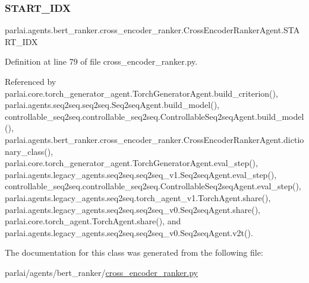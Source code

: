 \subsubsection{\texorpdfstring{S\+T\+A\+R\+T\+\_\+\+I\+DX}{START\_IDX}}
{\footnotesize\ttfamily parlai.\+agents.\+bert\+\_\+ranker.\+cross\+\_\+encoder\+\_\+ranker.\+Cross\+Encoder\+Ranker\+Agent.\+S\+T\+A\+R\+T\+\_\+\+I\+DX}



Definition at line 79 of file cross\+\_\+encoder\+\_\+ranker.\+py.



Referenced by parlai.\+core.\+torch\+\_\+generator\+\_\+agent.\+Torch\+Generator\+Agent.\+build\+\_\+criterion(), parlai.\+agents.\+seq2seq.\+seq2seq.\+Seq2seq\+Agent.\+build\+\_\+model(), controllable\+\_\+seq2seq.\+controllable\+\_\+seq2seq.\+Controllable\+Seq2seq\+Agent.\+build\+\_\+model(), parlai.\+agents.\+bert\+\_\+ranker.\+cross\+\_\+encoder\+\_\+ranker.\+Cross\+Encoder\+Ranker\+Agent.\+dictionary\+\_\+class(), parlai.\+core.\+torch\+\_\+generator\+\_\+agent.\+Torch\+Generator\+Agent.\+eval\+\_\+step(), parlai.\+agents.\+legacy\+\_\+agents.\+seq2seq.\+seq2seq\+\_\+v1.\+Seq2seq\+Agent.\+eval\+\_\+step(), controllable\+\_\+seq2seq.\+controllable\+\_\+seq2seq.\+Controllable\+Seq2seq\+Agent.\+eval\+\_\+step(), parlai.\+agents.\+legacy\+\_\+agents.\+seq2seq.\+torch\+\_\+agent\+\_\+v1.\+Torch\+Agent.\+share(), parlai.\+agents.\+legacy\+\_\+agents.\+seq2seq.\+seq2seq\+\_\+v0.\+Seq2seq\+Agent.\+share(), parlai.\+core.\+torch\+\_\+agent.\+Torch\+Agent.\+share(), and parlai.\+agents.\+legacy\+\_\+agents.\+seq2seq.\+seq2seq\+\_\+v0.\+Seq2seq\+Agent.\+v2t().



The documentation for this class was generated from the following file\+:\begin{DoxyCompactItemize}
\item 
parlai/agents/bert\+\_\+ranker/\hyperlink{cross__encoder__ranker_8py}{cross\+\_\+encoder\+\_\+ranker.\+py}\end{DoxyCompactItemize}
